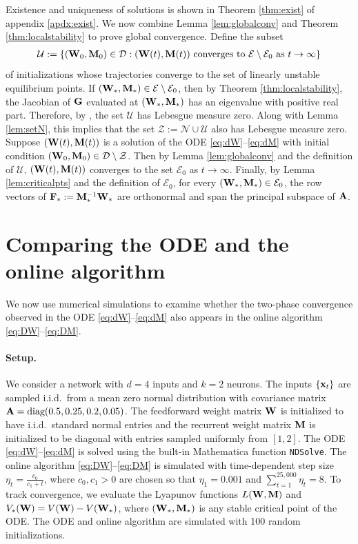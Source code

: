 \documentclass[11pt]{article}
\theoremstyle{definition}
\newcommand{\x}{{\bf x}}
\newcommand{\A}{{\bf A}}
\newcommand{\F}{{\bf F}}
\newcommand{\G}{{\bf G}}
\newcommand{\M}{{\bf M}}
\newcommand{\W}{{\bf W}}
\newcommand{\calD}{\mathcal{D}}
\newcommand{\calE}{\mathcal{E}}
\newcommand{\calN}{\mathcal{N}}
\newcommand{\calU}{\mathcal{U}}
\newcommand{\calZ}{\mathcal{Z}}
\begin{document}
Existence and uniqueness of solutions is shown in Theorem \ref{thm:exist} of appendix \ref{apdx:exist}. We now combine Lemma \ref{lem:globalconv} and Theorem \ref{thm:localstability} to prove global convergence. Define the subset
\begin{align*}
    \calU:=\left\{(\W_0,\M_0)\in\calD:(\W(t),\M(t))\text{ converges to $\calE\setminus\calE_0$ as $t\to\infty$}\right\}
\end{align*}
of initializations whose trajectories converge to the set of linearly unstable equilibrium points. If $(\W_\ast,\M_\ast)\in\calE\setminus\calE_0$, then by Theorem \ref{thm:localstability}, the Jacobian of $\G$ evaluated at $(\W_\ast,\M_\ast)$ has an eigenvalue with positive real part. Therefore, by \cite[Proposition 3]{potrie2009local}, the set $\calU$ has Lebesgue measure zero. Along with Lemma \ref{lem:setN}, this implies that the set $\calZ:=\calN\cup\calU$ also has Lebesgue measure zero. Suppose $(\W(t),\M(t))$ is a solution of the ODE \eqref{eq:dW}--\eqref{eq:dM} with initial condition $(\W_0,\M_0)\in\calD\setminus\calZ$. Then by Lemma \ref{lem:globalconv} and the definition of $\calU$, $(\W(t),\M(t))$ converges to the set $\calE_0$ as $t\to\infty$. Finally, by Lemma \ref{lem:criticalpts} and the definition of $\calE_0$, for every $(\W_\ast,\M_\ast)\in\calE_0$, the row vectors of $\F_\ast:=\M_\ast^{-1}\W_\ast$ are orthonormal and span the principal subspace of $\A$.

\section{Comparing the ODE and the online algorithm}
\label{sec:stochastic}

We now use numerical simulations to examine whether the two-phase convergence observed in the ODE \eqref{eq:dW}--\eqref{eq:dM} also appears in the online algorithm \eqref{eq:DW}--\eqref{eq:DM}.

\paragraph{Setup.} We consider a network with $d=4$ inputs and $k=2$ neurons.
The inputs $\{\x_t\}$ are sampled i.i.d.\ from a mean zero normal distribution with covariance matrix $\A=\text{diag}(0.5,0.25,0.2,0.05)$.
The feedforward weight matrix $\W$ is initialized to have i.i.d.\ standard normal entries and the recurrent weight matrix $\M$ is initialized to be diagonal with entries sampled uniformly from $[1,2]$.
The ODE \eqref{eq:dW}--\eqref{eq:dM} is solved using the built-in Mathematica function \texttt{NDSolve}.
The online algorithm \eqref{eq:DW}--\eqref{eq:DM} is simulated with time-dependent step size $\eta_t=\frac{c_0}{c_1+t}$, where $c_0,c_1>0$ are chosen so that $\eta_1=0.001$ and $\sum_{t=1}^{25,000}\eta_t=8$.
To track convergence, we evaluate the Lyapunov functions $L(\W,\M)$ and $V_\ast(\W)=V(\W)-V(\W_\ast)$, where $(\W_\ast,\M_\ast)$ is any stable critical point of the ODE.
The ODE and online algorithm are simulated with 100 random initializations.
\end{document}
